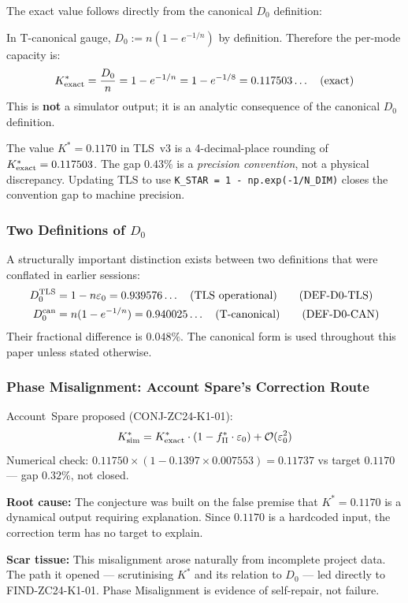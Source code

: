 \documentclass[12pt, a4paper]{article}
\begin{document}
The exact value follows directly from the canonical $D_0$
definition:

\begin{derivedbox}[title={FIND-ZC24-K1-01: Exact Per-Mode
  Resolution Capacity}]
In T-canonical gauge, $D_0 := n(1-e^{-1/n})$ by definition.
Therefore the per-mode capacity is:
\[
  K^*_{\rm exact} = \frac{D_0}{n} = 1 - e^{-1/n}
  = 1 - e^{-1/8} = 0.117503\ldots \quad \text{(exact)}
\]
This is \textbf{not} a simulator output; it is an analytic
consequence of the canonical $D_0$ definition.
\end{derivedbox}

\begin{formalbox}[title={COR-ZC24-K1-01: TLS Convention Update}]
The value $K^* = 0.1170$ in TLS~v3 is a 4-decimal-place rounding
of $K^*_{\rm exact} = 0.117503$. The gap $0.43\%$ is a
\emph{precision convention}, not a physical discrepancy.
Updating TLS to use \texttt{K\_STAR = 1 - np.exp(-1/N\_DIM)}
closes the convention gap to machine precision.
\end{formalbox}

\subsubsection{Two Definitions of $D_0$}

A structurally important distinction exists between two definitions
that were conflated in earlier sessions:
\begin{align}
  D_0^{\rm TLS}  &= 1 - n\varepsilon_0 = 0.939576\ldots
    \quad \text{(TLS operational)} \tag{DEF-D0-TLS} \\
  D_0^{\rm can}  &= n(1-e^{-1/n})     = 0.940025\ldots
    \quad \text{(T-canonical)} \tag{DEF-D0-CAN}
\end{align}
Their fractional difference is $0.048\%$. The canonical form is
used throughout this paper unless stated otherwise.

\subsubsection{Phase Misalignment: Account Spare's Correction Route}

\begin{keybox}[title={PM-ZC24-K1-01 (Phase Misalignment, not Error)}]
Account~Spare proposed (CONJ-ZC24-K1-01):
\[
  K^*_{\rm sim} = K^*_{\rm exact}\cdot(1 - f_{\rm II}^*\cdot\varepsilon_0)
  + \mathcal{O}(\varepsilon_0^2)
\]
Numerical check:
$0.11750 \times (1 - 0.1397 \times 0.007553) = 0.11737$
vs target $0.1170$ --- gap $0.32\%$, not closed.

\medskip
\textbf{Root cause:} The conjecture was built on the false premise
that $K^* = 0.1170$ is a dynamical output requiring explanation.
Since $0.1170$ is a hardcoded input, the correction term has no
target to explain.

\medskip
\textbf{Scar tissue:} This misalignment arose naturally from
incomplete project data. The path it opened --- scrutinising
$K^*$ and its relation to $D_0$ --- led directly to
FIND-ZC24-K1-01. Phase Misalignment is evidence of self-repair,
not failure.
\end{keybox}
\end{document}
